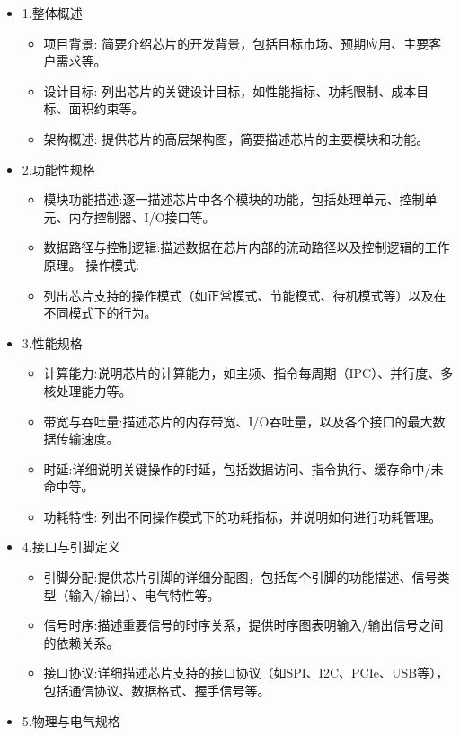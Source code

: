\begin{itemize}
\item
  1.整体概述

  \begin{itemize}
  \tightlist
  \item
    项目背景:
    简要介绍芯片的开发背景，包括目标市场、预期应用、主要客户需求等。
  \item
    设计目标:
    列出芯片的关键设计目标，如性能指标、功耗限制、成本目标、面积约束等。
  \item
    架构概述: 提供芯片的高层架构图，简要描述芯片的主要模块和功能。
  \end{itemize}
\item
  2.功能性规格

  \begin{itemize}
  \tightlist
  \item
    模块功能描述:逐一描述芯片中各个模块的功能，包括处理单元、控制单元、内存控制器、I/O接口等。
  \item
    数据路径与控制逻辑:描述数据在芯片内部的流动路径以及控制逻辑的工作原理。
    操作模式:
  \item
    列出芯片支持的操作模式（如正常模式、节能模式、待机模式等）以及在不同模式下的行为。
  \end{itemize}
\item
  3.性能规格

  \begin{itemize}
  \tightlist
  \item
    计算能力:说明芯片的计算能力，如主频、指令每周期（IPC）、并行度、多核处理能力等。
  \item
    带宽与吞吐量:描述芯片的内存带宽、I/O吞吐量，以及各个接口的最大数据传输速度。
  \item
    时延:详细说明关键操作的时延，包括数据访问、指令执行、缓存命中/未命中等。
  \item
    功耗特性: 列出不同操作模式下的功耗指标，并说明如何进行功耗管理。
  \end{itemize}
\item
  4.接口与引脚定义

  \begin{itemize}
  \tightlist
  \item
    引脚分配:提供芯片引脚的详细分配图，包括每个引脚的功能描述、信号类型（输入/输出）、电气特性等。
  \item
    信号时序:描述重要信号的时序关系，提供时序图表明输入/输出信号之间的依赖关系。
  \item
    接口协议:详细描述芯片支持的接口协议（如SPI、I2C、PCIe、USB等），包括通信协议、数据格式、握手信号等。
  \end{itemize}
\item
  5.物理与电气规格


\end{itemize}
